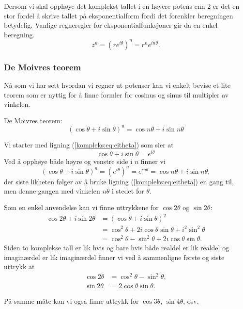 \documentclass[a4paper,norsk,12pt]{article}
\newcounter{exa}
\begin{document}
Dersom vi skal opphøye det komplekst tallet i en høyere potens enn 2 er det en stor fordel å skrive tallet på eksponentialform fordi det forenkler beregningen betydelig. Vanlige regneregler for eksponentialfunksjoner gir da en enkel beregning.
\begin{displaymath}
	z^n = \left(re^{i\theta}\right)^n = r^n e^{in\theta}.
\end{displaymath}

\subsubsection{De Moivres teorem}
Nå som vi har sett hvordan vi regner ut potenser kan vi enkelt bevise et lite teorem som er nyttig for å finne formler for cosinus og sinus til multipler av vinkelen.
\begin{ttheorem}
De Moivres teorem: 
\begin{displaymath}
	\left(\cos\theta + i\sin\theta\right)^n = \cos n\theta + i\sin n\theta
\end{displaymath}
\end{ttheorem}
\begin{tproof}
Vi starter med ligning (\ref{kompleks:eq:eitheta}) som sier at
\begin{displaymath}
	\cos\theta + i\sin\theta = e^{i\theta}
\end{displaymath}
Ved å opphøye både høyre og venstre side i $n$ finner vi
\begin{displaymath}
	\left(\cos\theta+ i\sin\theta\right)^n = \left(e^{i\theta}\right)^n = e^{in\theta} = \cos n\theta + i\sin n\theta,
\end{displaymath}
der siste likheten følger av å bruke ligning (\ref{kompleks:eq:eitheta}) en gang til, men denne gangen med vinkelen $n\theta$ i stedet for $\theta$.
\end{tproof}

\begin{texample}
Som en enkel anvendelse kan vi finne uttrykkene for $\cos2\theta$ og $\sin2\theta$:
\begin{align*}
	\cos2\theta + i\sin2\theta &= (\cos\theta + i\sin\theta)^2 \\
	&=\cos^2\theta + 2i\cos\theta\sin\theta + i^2\sin^2\theta \\
	&=\cos^2\theta-\sin^2\theta + 2i\cos\theta\sin\theta.
\end{align*}
Siden to komplekse tall er lik hvis og bare hvis både realdel er lik realdel og imaginærdel er lik imaginærdel finner vi ved å sammenligne første og siste uttrykk at 
\begin{align*}
	\cos2\theta &= \cos^2\theta - \sin^2\theta, \\
	\sin2\theta &= 2\cos\theta\sin\theta.
\end{align*}
\end{texample}
\noindent
På samme måte kan vi også finne uttrykk for $\cos3\theta$, $\sin4\theta$, osv.
\end{document}
